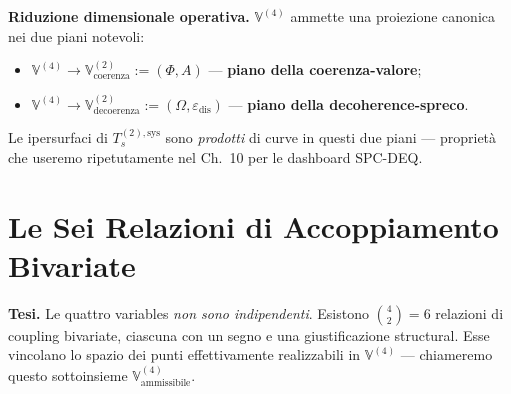 \Hypoth{} \textbf{Riduzione dimensionale operativa.}
\(\mathbb{V}^{(4)}\) ammette una proiezione canonica nei due piani
notevoli:

\begin{itemize}
\tightlist
\item
  \(\mathbb{V}^{(4)} \to \mathbb{V}^{(2)}_{\text{coerenza}} := (\Phi, A)\)
  --- \textbf{piano della coerenza-valore};
\item
  \(\mathbb{V}^{(4)} \to \mathbb{V}^{(2)}_{\text{decoerenza}} := (\Omega, \varepsilon_{\text{dis}})\)
  --- \textbf{piano della decoherence-spreco}.
\end{itemize}

Le ipersurfaci di \(T_s^{(2),\text{sys}}\) sono \emph{prodotti} di curve
in questi due piani --- proprietà che useremo ripetutamente nel Ch.~10
per le dashboard SPC-DEQ.



\section{Le Sei Relazioni di Accoppiamento
Bivariate}\label{le-sei-relazioni-di-coupling-bivariate}

\Hypoth{} \textbf{Tesi.} Le quattro variables \emph{non sono
indipendenti}. Esistono \(\binom{4}{2} = 6\) relazioni di coupling
bivariate, ciascuna con un segno e una giustificazione structural. Esse
vincolano lo spazio dei punti effettivamente realizzabili in
\(\mathbb{V}^{(4)}\) --- chiameremo questo sottoinsieme
\(\mathbb{V}^{(4)}_{\text{ammissibile}}\).

